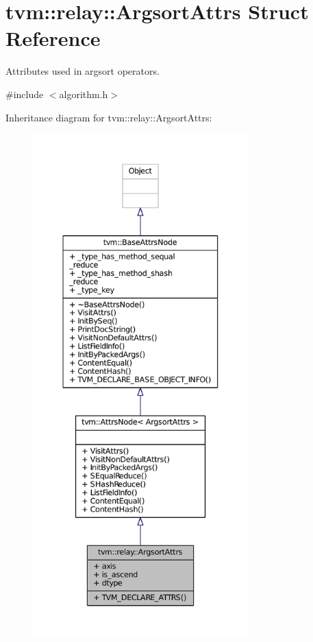 \hypertarget{structtvm_1_1relay_1_1ArgsortAttrs}{}\section{tvm\+:\+:relay\+:\+:Argsort\+Attrs Struct Reference}
\label{structtvm_1_1relay_1_1ArgsortAttrs}


Attributes used in argsort operators.  




{\ttfamily \#include $<$algorithm.\+h$>$}



Inheritance diagram for tvm\+:\+:relay\+:\+:Argsort\+Attrs\+:
\nopagebreak
\begin{figure}[H]
\begin{center}
\leavevmode
\includegraphics[height=550pt]{structtvm_1_1relay_1_1ArgsortAttrs__inherit__graph}
\end{center}
\end{figure}


